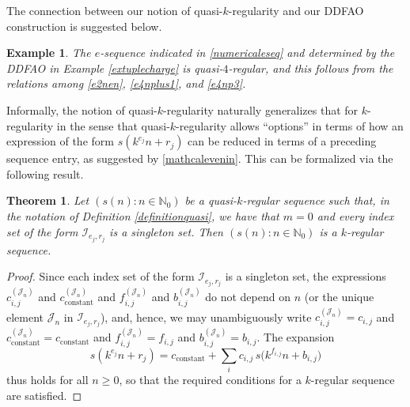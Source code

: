 \documentclass[12pt]{article}
\newtheorem{theorem}{Theorem}
\newtheorem{example}{Example}
\begin{document}
 The connection between our notion of quasi-$k$-regularity and our DDFAO construction is suggested below. 

\begin{example}\label{showequasi}
 The $e$-sequence indicated in \eqref{numericaleseq} 
 and determined by the DDFAO in Example \ref{extuplecharge} 
 is quasi-$4$-regular, and this follows from the relations among 
 \eqref{e2nen}, \eqref{e4nplus1}, and \eqref{e4np3}. 
\end{example}

 Informally, the notion of quasi-$k$-regularity naturally generalizes that for 
 $k$-regularity in the sense that quasi-$k$-regularity allows 
 ``options'' in terms of how 
 an expression of the form $ s(k^{e_j} n + r_j ) $ can be reduced 
 in terms of a preceding sequence entry, as suggested by \eqref{mathcalevenin}. 
 This can be formalized via the following result. 

\begin{theorem}\label{quasiktheorem}
 Let $(s(n) : n \in \mathbb{N}_{0})$ be a quasi-$k$-regular sequence 
 such that, in the notation of Definition \ref{definitionquasi}, we have that $m = 0$
 and every index set of the form $\mathcal{I}_{e_{j}, r_{j}}$ is a singleton set.
 Then $(s(n) : n \in \mathbb{N}_{0})$ is a $k$-regular sequence. 
\end{theorem}

\begin{proof}
 Since each index set of the form $\mathcal{I}_{e_{j}, r_{j}}$ is a singleton set, the expressions $c_{i, j}^{\left( \mathcal{J}_{n} \right)}$ 
 and $c_{\text{constant}}^{\left( \mathcal{J}_{n} \right)}$ and $f_{i, j}^{\left( \mathcal{J}_{n} \right)} $ and $ b_{i, 
 j}^{\left( \mathcal{J}_{n} \right)} $ do not depend on $n$ (or the unique element $\mathcal{J}_{n}$ in $ \mathcal{I}_{e_j, r_j}$), and, 
 hence, we may unambiguously write $c_{i, j}^{\left( \mathcal{J}_{n} \right)} = c_{i, j}$ and $c_{\text{constant}}^{\left( \mathcal{J}_{n} 
 \right)} = c_{\text{constant}}$ and $f_{i, j}^{\left( \mathcal{J}_{n} \right)} = f_{i, j}$ and $ b_{i, j}^{\left( \mathcal{J}_{n} \right)} = b_{i, j}$. 
 The expansion 
\begin{equation*}
 s(k^{e_j} n + r_j ) = c_{\text{constant}} + \sum_{i} c_{i, j} \, s\big( k^{f_{i, j}} n + b_{i, j} \big) 
\end{equation*}
 thus holds for all $n \geq 0$, so that the required conditions for a $k$-regular sequence are satisfied. 
\end{proof}
\end{document}
